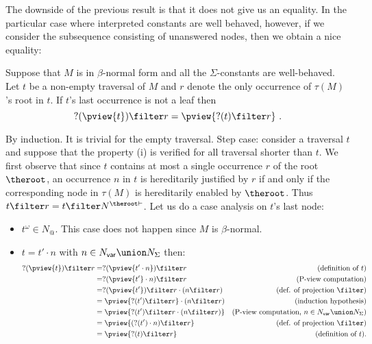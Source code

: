 The downside of the previous result is that it does not give us an
equality. In the particular case where interpreted constants are
well behaved, however, if we consider the subsequence consisting of
unanswered nodes, then we obtain a nice equality:
\begin{lemma}
\label{lem:betanf_wellbehavedconst_trav_pview_red} Suppose that $M$
is in $\beta$-normal form and all the $\Sigma$-constants are
well-behaved. Let $t$ be a non-empty traversal of $M$ and $r$ denote
the only occurrence of $\tau(M)$'s root in $t$. If $t$'s last
occurrence is not a leaf then
$$ ?(\pview{t}) \filter r = \pview{?(t) \filter  r }\ .$$
\end{lemma}
\proof By induction. It is trivial for the empty traversal. Step
case: consider a traversal $t$ and suppose that the property (i) is
verified for all traversal shorter than $t$. We first observe that
since $t$ contains at most a single occurrence $r$ of the root
$\theroot$, an occurrence $n$ in $t$ is hereditarily justified by
$r$ if and only if the corresponding node in $\tau(M)$ is
hereditarily enabled by $\theroot$. Thus $t\filter r = t \filter
N^{\theroot \vdash}$. Let us do a case analysis on $t$'s last node:
\begin{itemize}
\item $t^\omega \in N_@$. This case does not happen since $M$ is $\beta$-normal.

\item $t = t' \cdot n$ with $n \in N_{\sf var} \union N_\Sigma$ then:
    \begin{align*}
    ?(\pview{t}) \filter  r
        &= ?(\pview{t' \cdot n}) \filter  r & (\mbox{definition of } t)\\
        &= ?(\pview{t'} \cdot n) \filter  r  & (\mbox{P-view computation}) \\
        &= ?(\pview{t'}) \filter  r  \cdot (n \filter  r)            & (\mbox{def. of projection $\filter$}) \\
        &= \pview{?(t') \filter r} \cdot (n \filter  r)           & (\mbox{induction hypothesis}) \\
        &= \pview{?(t') \filter  r \cdot (n \filter  r) } & (\mbox{P-view computation, $n \in N_{\sf var} \union N_{\Sigma}$}) \\
        &= \pview{(?(t') \cdot n ) \filter  r }           & (\mbox{def. of projection $\filter$}) \\
        &= \pview{?(t) \filter  r  }
 & (\mbox{definition of } t).
    \end{align*}
\end{itemize}
